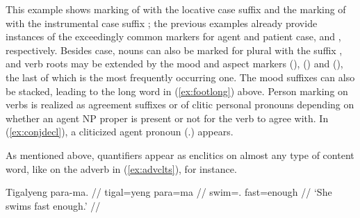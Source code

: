 This example shows marking of  with the locative case
suffix  and the marking of  with the
instrumental case suffix ; the previous examples already
provide instances of the exceedingly common markers for agent and patient case,
 and , respectively. Besides case, nouns can
also be marked for plural with the suffix , and verb roots may
be extended by the mood and aspect markers  (\Irr{}),
 (\Hab{}) and  (\Neg{}), the last of which is 
the most frequently occurring one. The mood suffixes can also be stacked,
leading to the long word in (\ref{ex:footlong}) above. Person marking on verbs
is realized as agreement suffixes or of clitic personal pronouns depending on
whether an agent NP proper is present or not for the verb to agree with. In
(\ref{ex:conjdecl}), a cliticized agent pronoun 
(\Fsg{}.\Aarg{}) appears.

As mentioned above, quantifiers appear as enclitics on almost any type of
content word, like on the adverb  in (\ref{ex:advclts}),
for instance.

\ex\label{ex:advclts}
\begingl
	\gla Tigalyeng para-ma. //
	\glb tigal=yeng para=ma //
	\glc swim=\TsgF{}.\Aarg{} fast=enough //
	\glft `She swims fast enough.' //
\endgl

% 
% 
\xe

